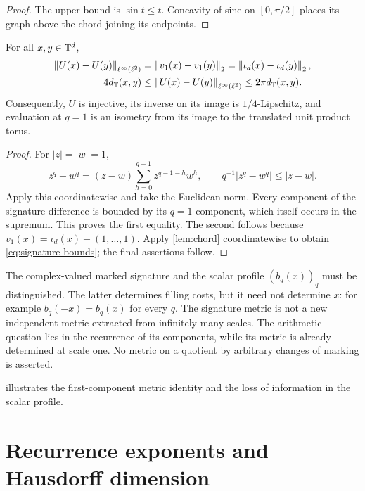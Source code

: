 \documentclass[11pt,a4paper]{article}
\begin{document}
\begin{proof}
The upper bound is $\sin t\leq t$.  Concavity of sine on $[0,\pi/2]$
places its graph above the chord joining its endpoints.
\end{proof}

\begin{theorem}\label{thm:signature}
For all $x,y\in\mathbb T^d$,
\begin{align}
 \left\lVert U(x)-U(y)\right\rVert_{\ell^\infty(\ell^2)}
 &=\left\lVert v_1(x)-v_1(y)\right\rVert_2
   =\left\lVert\iota_d(x)-\iota_d(y)\right\rVert_2,\label{eq:signature-isometry}\\
 4d_{\mathbb T}(x,y)&\leq\left\lVert U(x)-U(y)\right\rVert_{\ell^\infty(\ell^2)}
                 \leq2\pi d_{\mathbb T}(x,y).\label{eq:signature-bounds}
\end{align}
Consequently, $U$ is injective, its inverse on its image is
$1/4$-Lipschitz, and evaluation at $q=1$ is an isometry from its image
to the translated unit product torus.
\end{theorem}

\begin{proof}
For $|z|=|w|=1$,
\[
 z^q-w^q=(z-w)\sum_{h=0}^{q-1}z^{q-1-h}w^h,
 \qquad q^{-1}|z^q-w^q|\leq|z-w|.
\]
Apply this coordinatewise and take the Euclidean norm.  Every component
of the signature difference is bounded by its $q=1$ component, which
itself occurs in the supremum.  This proves the first equality.  The
second follows because $v_1(x)=\iota_d(x)-(1,\ldots,1)$.
Apply \cref{lem:chord} coordinatewise to obtain
\cref{eq:signature-bounds}; the final assertions follow.
\end{proof}

The complex-valued marked signature and the scalar profile $(b_q(x))_q$
must be distinguished.  The latter determines filling costs, but it need
not determine $x$: for example $b_q(-x)=b_q(x)$ for every $q$.
The signature metric is not a new independent metric extracted from
infinitely many scales.  The arithmetic question lies in the recurrence
of its components, while its metric is already determined at scale one.
No metric on a quotient by arbitrary changes of marking is asserted.

 illustrates the first-component metric
identity and the loss of information in the scalar profile.


\section{Recurrence exponents and Hausdorff dimension}
\label{sec:dimension}
\end{document}
